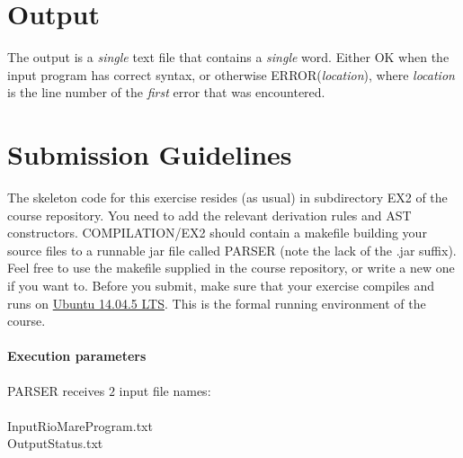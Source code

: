 \documentclass{article}
\begin{document}
\section{Output}
The output is a \textit{single} text file that contains a \textit{single} word.
Either OK when the input program has correct syntax,
or otherwise ERROR(\textit{location}), where \textit{location}
is the line number of the \textit{first} error that was encountered.
\section{Submission Guidelines}
The skeleton code for this exercise resides (as usual)
in subdirectory EX2 of the course repository.
You need to add the relevant derivation rules and AST constructors.
COMPILATION/EX2 should contain a makefile building your source files to a
runnable jar file called PARSER (note the lack of the .jar suffix).
Feel free to use the makefile supplied in the course repository,
or write a new one if you want to. 
Before you submit, make sure that your exercise compiles and runs
on \href{http://releases.ubuntu.com/14.04/}{Ubuntu 14.04.5 LTS}.
This is the formal running environment of the course.
\paragraph{Execution parameters}
PARSER receives $2$ input file names:\\ \\
InputRioMareProgram.txt\\
OutputStatus.txt
\end{document}
